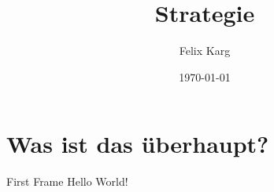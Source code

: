 \documentclass[12pt,compress,ngerman,utf8,t]{beamer}
\date{\today}
\institute{University of Freiburg}
\title{Strategie}
\author{Felix Karg}
\begin{document}
\maketitle

\frame{\tableofcontents}


\section{Was ist das überhaupt?}
\begin{frame}{First Frame}
    Hello World!
\end{frame}
\end{document}
